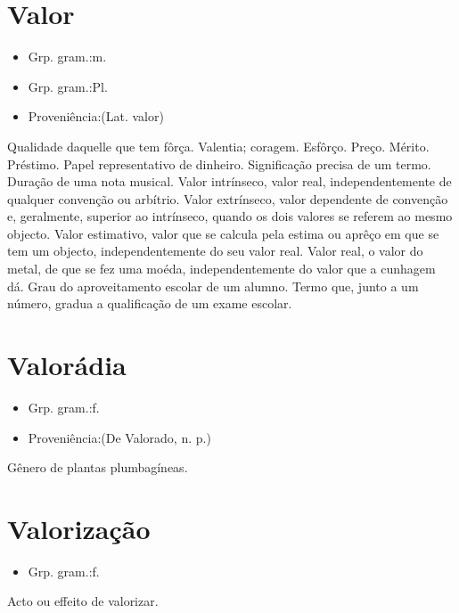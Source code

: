 \documentclass{article}
\begin{document}
\section{Valor}
\begin{itemize}
\item {Grp. gram.:m.}
\end{itemize}
\begin{itemize}
\item {Grp. gram.:Pl.}
\end{itemize}
\begin{itemize}
\item {Proveniência:(Lat. \textunderscore valor\textunderscore )}
\end{itemize}
Qualidade daquelle que tem fôrça.
Valentia; coragem.
Esfôrço.
Preço.
Mérito.
Préstimo.
Papel representativo de dinheiro.
Significação precisa de um termo.
Duração de uma nota musical.
\textunderscore Valor intrínseco\textunderscore , valor real, independentemente de qualquer convenção ou arbítrio.
\textunderscore Valor extrínseco\textunderscore , valor dependente de convenção e, geralmente, superior ao intrínseco, quando os dois valores se referem ao mesmo objecto.
\textunderscore Valor estimativo\textunderscore , valor que se calcula pela estima ou aprêço em que se tem um objecto, independentemente do seu valor real.
\textunderscore Valor real\textunderscore , o valor do metal, de que se fez uma moéda, independentemente do valor que a cunhagem dá.
Grau do aproveitamento escolar de um alumno.
Termo que, junto a um número, gradua a qualificação de um exame escolar.
\section{Valorádia}
\begin{itemize}
\item {Grp. gram.:f.}
\end{itemize}
\begin{itemize}
\item {Proveniência:(De \textunderscore Valorado\textunderscore , n. p.)}
\end{itemize}
Gênero de plantas plumbagíneas.
\section{Valorização}
\begin{itemize}
\item {Grp. gram.:f.}
\end{itemize}
Acto ou effeito de valorizar.
\end{document}
